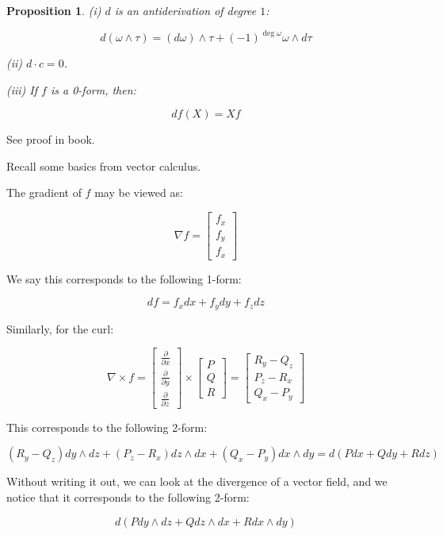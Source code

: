 \documentclass[10pt]{article}
\newtheorem{proposition}{Proposition}[section]
\begin{document}
\begin{proposition}
(i) $d$ is an antiderivation of degree $1$:

$$ d(\omega \wedge \tau) = (d\omega) \wedge \tau + (-1)^{\deg \omega} \omega \wedge d\tau $$

(ii) $d \cdot c = 0$.

(iii) If $f$ is a 0-form, then:

$$ df(X) = Xf $$
\end{proposition}

See proof in book.

Recall some basics from vector calculus.

The gradient of $f$ may be viewed as:

$$\nabla f = \begin{bmatrix} f_x \\ f_y \\ f_x  \end{bmatrix}$$

We say this corresponds to the following 1-form:

$$df = f_x dx + f_y dy + f_z dz $$

Similarly, for the curl:

$$ \nabla \times f = \begin{bmatrix} \frac{\partial}{\partial x} \\ \frac{\partial}{\partial y} \\ \frac{\partial}{\partial z} \end{bmatrix} \times \begin{bmatrix} P \\ Q \\ R \end{bmatrix} = \begin{bmatrix} R_y - Q_z \\ P_z - R_x \\ Q_x - P_y \end{bmatrix} $$

This corresponds to the following 2-form:

$$(R_y - Q_z) dy \wedge dz + (P_z - R_x) dz \wedge dx + (Q_x - P_y) dx \wedge dy = d(P dx + Q dy + R dz) $$

Without writing it out, we can look at the divergence of a vector field, and we notice that it corresponds to the following 2-form:

$$d(P dy \wedge dz + Q dz \wedge dx + R dx \wedge dy) $$
\end{document}
